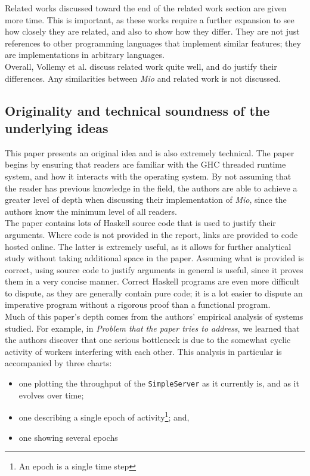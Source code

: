 \documentclass[9pt]{report}
\begin{document}
\noindent
Related works discussed toward the end of the related work section are given more time.
This is important, as these works require a further expansion to see how closely they are related, and also to show how they differ.
They are not just references to other programming languages that implement similar features; they are implementations in arbitrary languages.\\

Overall, Vollemy et al. discuss related work quite well, and do justify their differences. Any similarities between {\it Mio} and related work is not discussed.

\subsection*{Originality and technical soundness of the underlying ideas}
This paper presents an original idea and is also extremely technical.
The paper begins by ensuring that readers are familiar with the GHC threaded runtime system, and how it interacts with the operating system.
By not assuming that the reader has previous knowledge in the field, the authors are able to achieve a greater level of depth when discussing their implementation of {\it Mio}, since the authors know the minimum level of all readers.\\

\noindent
The paper contains lots of Haskell source code that is used to justify their arguments.
Where code is not provided in the report, links are provided to code hosted online.
The latter is extremely useful, as it allows for further analytical study without taking additional space in the paper.
Assuming what is provided is correct, using source code to justify arguments in general is useful, since it proves them in a very concise manner.
Correct Haskell programs are even more difficult to dispute, as they are generally contain pure code; it is a lot easier to dispute an imperative program without a rigorous proof than a functional program.\\

\noindent
Much of this paper's depth comes from the authors' empirical analysis of systems studied.
For example, in {\it Problem that the paper tries to address}, we learned that the authors discover that one serious bottleneck is due to the somewhat cyclic activity of workers interfering with each other.
This analysis in particular is accompanied by three charts:
\begin{itemize}
\item one plotting the throughput of the \verb/SimpleServer/ as it currently is, and as it evolves over time;
\item one describing a single epoch of activity\footnote{An epoch is a single time step}; and,
\item one showing several epochs
\end{itemize}
\end{document}
